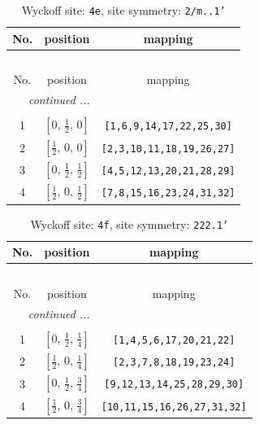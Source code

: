 \documentclass[fleqn,8pt]{jsarticle}
\begin{document}
\begin{longtable}{ccc}
\caption{Wyckoff site: {\tt 4e}, site symmetry: {\tt 2/m..1'}}
 \\
 \hline \hline
No. & position & mapping \\ \hline \endfirsthead

\multicolumn{2}{l}{\tablename\ \thetable{}} \\
 \hline \hline
No. & position & mapping \\ \hline \endhead

 \hline \hline
\multicolumn{2}{r}{\footnotesize\it continued ...} \\ \endfoot

 \hline \hline
\multicolumn{2}{r}{} \\ \endlastfoot

1 & $\left[ 0,\, \frac{1}{2},\, 0 \right]$ & {\tt [1,6,9,14,17,22,25,30]} \\ \hline
2 & $\left[ \frac{1}{2},\, 0,\, 0 \right]$ & {\tt [2,3,10,11,18,19,26,27]} \\ \hline
3 & $\left[ 0,\, \frac{1}{2},\, \frac{1}{2} \right]$ & {\tt [4,5,12,13,20,21,28,29]} \\ \hline
4 & $\left[ \frac{1}{2},\, 0,\, \frac{1}{2} \right]$ & {\tt [7,8,15,16,23,24,31,32]} \\
\end{longtable}
\renewcommand{\arraystretch}{1.2}
\begin{longtable}{ccc}
\caption{Wyckoff site: {\tt 4f}, site symmetry: {\tt 222.1'}}
 \\
 \hline \hline
No. & position & mapping \\ \hline \endfirsthead

\multicolumn{2}{l}{\tablename\ \thetable{}} \\
 \hline \hline
No. & position & mapping \\ \hline \endhead

 \hline \hline
\multicolumn{2}{r}{\footnotesize\it continued ...} \\ \endfoot

 \hline \hline
\multicolumn{2}{r}{} \\ \endlastfoot

1 & $\left[ 0,\, \frac{1}{2},\, \frac{1}{4} \right]$ & {\tt [1,4,5,6,17,20,21,22]} \\ \hline
2 & $\left[ \frac{1}{2},\, 0,\, \frac{1}{4} \right]$ & {\tt [2,3,7,8,18,19,23,24]} \\ \hline
3 & $\left[ 0,\, \frac{1}{2},\, \frac{3}{4} \right]$ & {\tt [9,12,13,14,25,28,29,30]} \\ \hline
4 & $\left[ \frac{1}{2},\, 0,\, \frac{3}{4} \right]$ & {\tt [10,11,15,16,26,27,31,32]} \\
\end{longtable}
\end{document}
